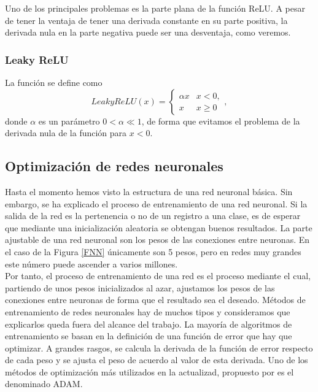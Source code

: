 \documentclass[spanish,a4paper, 11pt]{article}
\numberwithin{equation}{section}
\numberwithin{table}{section}
\numberwithin{figure}{section}
\begin{document}
Uno de los principales problemas es la parte plana de la función ReLU. A pesar de tener la ventaja de tener una derivada constante en su parte positiva, la derivada nula en la parte negativa puede ser una desventaja, como veremos.

\subsubsection{Leaky ReLU}

La función se define como 
\begin{equation}
LeakyReLU(x) = \begin{cases}
\alpha x & x < 0,\\
x & x \geq 0
\end{cases},
\end{equation}
donde $\alpha$ es un parámetro $ 0 < \alpha \ll 1$, de forma que evitamos el problema de la derivada nula de la función para $x<0$.
\subsection{Optimización de redes neuronales}

Hasta el momento hemos visto la estructura de una red neuronal básica. Sin embargo, se ha explicado el proceso de entrenamiento de una red neuronal. Si la salida de la red es la pertenencia o no de un registro a una clase, es de esperar que mediante una inicialización aleatoria se obtengan buenos resultados. La parte ajustable de una red neuronal son los pesos de las conexiones entre neuronas. En el caso de la Figura \ref{FNN} únicamente son 5 pesos, pero en redes muy grandes este número puede ascender a varios millones.\\

Por tanto, el proceso de entrenamiento de una red es el proceso mediante el cual, partiendo de unos pesos inicializados al azar, ajustamos los pesos de las conexiones entre neuronas de forma que el resultado sea el deseado. Métodos de entrenamiento de redes neuronales hay de muchos tipos y consideramos que explicarlos queda fuera del alcance del trabajo. La mayoría de algoritmos de entrenamiento se basan en la definición de una función de error que hay que optimizar. A grandes rasgos, se calcula la derivada de la función de error respecto de cada peso y se ajusta el peso de acuerdo al valor de esta derivada. Uno de los métodos de optimización más utilizados en la actualizad, propuesto por \citep{Kingma2014} es el denominado ADAM.
\end{document}
